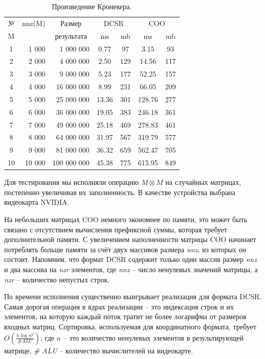 \documentclass[14pt]{extarticle}
\newcommand{\txt}{\textit}
\begin{document}
		\begin{table}
		\centering
		\scriptsize
		\small
		\begin{tabular}{ |c|r|r|c c|c c|} 
			\hline 
			№ & nnz(M)  & \multicolumn{1}{c|}{Размер}   & \multicolumn{2}{c|}{DCSR} & \multicolumn{2}{c|}{COO} \\ \cline{4-7} 
			M &       & \multicolumn{1}{c|}{результата}  & ms & mb & ms & mb \\ \hline
			1 & 1 000 & 1 000 000 & 0.77 & 97 & 3.15 & 93 \\ \hline
        	2 & 2 000 & 4 000 000 & 2.50 & 129 & 14.56 & 117 \\ \hline
        	3 & 3 000 & 9 000 000 & 5.23 & 177 & 52.25 & 157 \\ \hline
        	4 & 4 000 & 16 000 000 & 8.99 & 231 & 66.05 & 209 \\ \hline
        	5 & 5 000 & 25 000 000 & 13.36 & 301 & 128.76 & 277 \\ \hline
        	6 & 6 000 & 36 000 000 & 19.05 & 383 & 246.18 & 361 \\ \hline
        	7 & 7 000 & 49 000 000 & 25.18 & 469 & 278.83 & 461 \\ \hline
        	8 & 8 000 & 64 000 000 & 31.97 & 567 & 319.79 & 577 \\ \hline
        	9 & 9 000 & 81 000 000 & 36.32 & 659 & 562.47 & 705 \\ \hline
        	10 & 10 000 & 100 000 000 & 45.38 & 775 & 615.95 & 849 \\ \hline

			
		\end{tabular}
		\caption{Произведение Кронекера.}
		\label{table:kron}
	\end{table} 
	
	Для тестирования мы исполняли операцию $M\otimes M$ на случайных матрицах, постепенно увеличивая их заполненность. В качестве устройства выбрана видеокарта NVIDIA. 
	
	На небольших матрицах COO немного экономнее по памяти, это может быть связано с отсутствием вычисления префиксной суммы, которая требует дополнительной памяти. С увеличением наполненности матрицы COO начинает потреблять больше памяти за счёт двух массивов размера \txt{nnz}, из которых он состоит. Напомним, что формат DCSR содержит только один массив размер \txt{nnz} и два массива на \txt{nzr} элементов, где \txt{nnz} --  число ненулевых значений матрицы, а \txt{nzr} -- количество непустых строк.
	
	По времени исполнения существенно выигрывает реализация для формата DCSR. Самая дорогая операция в ядрах реализации -- это индексация строк и их элементов, на которую каждый поток тратит не более логарифма от размеров входных матриц. Сортировка, используемая для координатного формата, требует $O(\frac{n\log{n}^2} {\# ALU})$, где $n$ -- это количество ненулевых элементов в результирующей матрице, \txt{\# ALU} -- количество вычислителей на видеокарте. 
	
\end{document}
